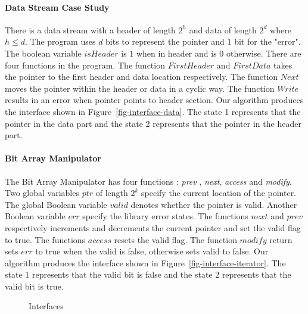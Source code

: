 \documentclass{llncs}
\begin{document}
\paragraph{Data Stream Case Study} There is a data stream with a header of length $2^h$ and data of length $2^d$ where $h \leq d$.
The program uses $d$ bits to represent the pointer and $1$ bit for the "error".
The boolean variable $isHeader$ is $1$ when in header and is $0$ otherwise. 
There are four functions in the program.
The function $FirstHeader$ and $FirstData$ takes the pointer to the first header and data location respectively. 
The function $Next$ moves the pointer within the header or data in a cyclic way.
The function $Write$ results in an error when pointer points to header section.
Our algorithm produces the interface shown in Figure~\ref{fig-interface-data}.
 The state 1 represents that the pointer in the data part and the state 2 represents that the pointer in the header part.


\paragraph{Bit Array Manipulator} The Bit Array Manipulator has four functions : {\em prev} , {\em next},
{\em access} and {\em modify}.
Two global variables $ptr$ of length $2^k$ specify the current location of the pointer.
The global Boolean variable $valid$ denotes whether the pointer is valid.  
Another Boolean variable $err$ specify the library error states.  
The functions $next$ and $prev$ respectively increments and decrements the current pointer  and set the valid flag to true.
The functions $access$ resets the valid flag. The function $modify$ return sets $err$ to true when the valid is false, otherwise sets valid to false. 
Our algorithm produces the interface shown in Figure~\ref{fig-interface-iterator}.
The state 1 represents that the valid bit is false and the state 2 represents that the valid bit is true.
\begin{figure}[t]
\begin{center}
\caption{Interfaces}
\end{center}
\end{figure}
\end{document}
